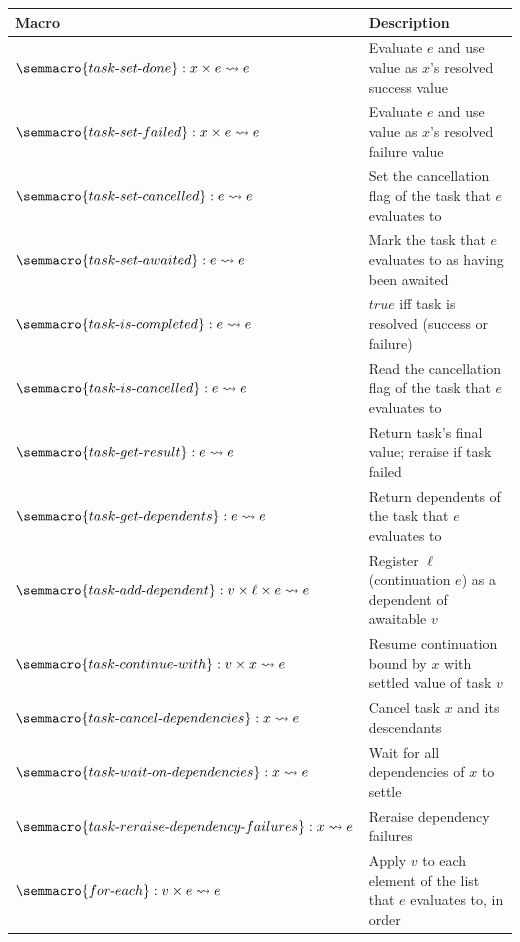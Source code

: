 \vspace{1em}
\noindent
\begin{tabularx}{\linewidth}{@{}l>{\raggedright\arraybackslash}X@{}}
\toprule
Macro & Description \\
\midrule
$\semmacro{task\text{-}set\text{-}done} : x \times e \rightsquigarrow e$ & Evaluate $e$ and use value as $x$'s resolved success value \\
$\semmacro{task\text{-}set\text{-}failed} : x \times e \rightsquigarrow e$ & Evaluate $e$ and use value as $x$'s resolved failure value \\
$\semmacro{task\text{-}set\text{-}cancelled} : e \rightsquigarrow e$ & Set the cancellation flag of the task that $e$ evaluates to \\
$\semmacro{task\text{-}set\text{-}awaited} : e \rightsquigarrow e$ & Mark the task that $e$ evaluates to as having been awaited \\
$\semmacro{task\text{-}is\text{-}completed} : e \rightsquigarrow e$ & $\mathit{true}$ iff task is resolved (success or failure) \\
$\semmacro{task\text{-}is\text{-}cancelled} : e \rightsquigarrow e$ & Read the cancellation flag of the task that $e$ evaluates to \\
$\semmacro{task\text{-}get\text{-}result} : e \rightsquigarrow e$ & Return task's final value; reraise if task failed \\
$\semmacro{task\text{-}get\text{-}dependents} : e \rightsquigarrow e$ & Return dependents of the task that $e$ evaluates to \\
$\semmacro{task\text{-}add\text{-}dependent} : v \times \ell \times e \rightsquigarrow e$ & Register $\ell$ (continuation $e$) as a dependent of awaitable $v$ \\
$\semmacro{task\text{-}continue\text{-}with} : v \times x \rightsquigarrow e$ & Resume continuation bound by $x$ with settled value of task $v$ \\
$\semmacro{task\text{-}cancel\text{-}dependencies} : x \rightsquigarrow e$ & Cancel task $x$ and its descendants \\
$\semmacro{task\text{-}wait\text{-}on\text{-}dependencies} : x \rightsquigarrow e$ & Wait for all dependencies of $x$ to settle \\
$\semmacro{task\text{-}reraise\text{-}dependency\text{-}failures} : x \rightsquigarrow e$ & Reraise dependency failures \\
$\semmacro{for\text{-}each} : v \times e \rightsquigarrow e$ & Apply $v$ to each element of the list that $e$ evaluates to, in order \\
\bottomrule
\end{tabularx}

